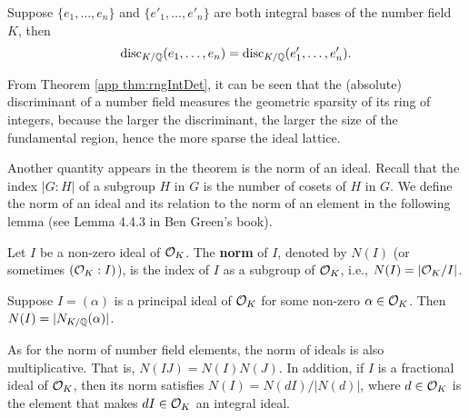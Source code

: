 \documentclass[../main.tex]{subfiles}
\begin{document}
\begin{corollary}
\reversemarginpar
{}
Suppose $\{e_1, \dots, e_n\}$ and $\{e'_1, \dots, e'_n\}$ are both integral bases of the number field $K$, then 
\begin{equation*}
    \text{disc}_{K / \mathbb{Q}}(e_1, \dots, e_n) =  \text{disc}_{K / \mathbb{Q}}(e'_1, \dots, e'_n).
\end{equation*}
\end{corollary}

From Theorem \ref{app thm:rngIntDet}, it can be seen that the (absolute) discriminant of a number field measures the geometric sparsity of its ring of integers, because the larger the discriminant, the larger the size of the fundamental region, hence the more sparse the ideal lattice. 

Another quantity appears in the theorem is the norm of an ideal. Recall that the index $|G:H|$ of a subgroup $H$ in $G$ is the number of cosets of $H$ in $G$. We define the norm of an ideal and its relation to the norm of an element in the following lemma (see Lemma 4.4.3 in Ben Green's book). 

\begin{definition}
\label{app def:idealNorm}
\reversemarginpar
{}
Let $I$ be a non-zero ideal of $\mathcal{O}_K$. The \textbf{norm} of $I$, denoted by $N(I)$ (or sometimes $(\mathcal{O}_K:I)$), is the index of $I$ as a subgroup of $\mathcal{O}_K$, i.e., $N(I) = |\mathcal{O}_K / I|$.
\end{definition}

\begin{lemma}
Suppose $I = (\alpha)$ is a principal ideal of $\mathcal{O}_K$ for some non-zero $\alpha \in \mathcal{O}_K$. Then $N(I) = |N_{K / \mathbb{Q}}(\alpha)|$. 
\end{lemma}

As for the norm of number field elements, the norm of ideals is also multiplicative. That is, $N(IJ) = N(I)N(J)$. In addition, if $I$ is a fractional ideal of $\mathcal{O}_K$, then its norm satisfies $N(I) = N(dI) / |N(d)|$, where $d \in \mathcal{O}_K$ is the element that makes $dI \in \mathcal{O}_K$ an integral ideal. 
\end{document}
